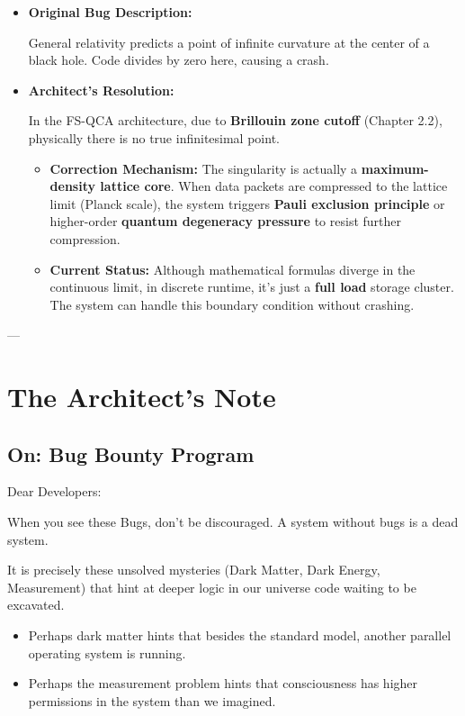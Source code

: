 \documentclass[11pt,a4paper,twoside]{book}
\begin{document}
\begin{itemize}
\item \textbf{Original Bug Description:}

General relativity predicts a point of infinite curvature at the center of a black hole. Code divides by zero here, causing a crash.

\item \textbf{Architect's Resolution:}

In the FS-QCA architecture, due to \textbf{Brillouin zone cutoff} (Chapter 2.2), physically there is no true infinitesimal point.

\begin{itemize}
\item \textbf{Correction Mechanism:} The singularity is actually a \textbf{maximum-density lattice core}. When data packets are compressed to the lattice limit (Planck scale), the system triggers \textbf{Pauli exclusion principle} or higher-order \textbf{quantum degeneracy pressure} to resist further compression.

\item \textbf{Current Status:} Although mathematical formulas diverge in the continuous limit, in discrete runtime, it's just a \textbf{full load} storage cluster. The system can handle this boundary condition without crashing.
\end{itemize}
\end{itemize}

---

\section{The Architect's Note}

\subsection{On: Bug Bounty Program}

Dear Developers:

When you see these Bugs, don't be discouraged. A system without bugs is a dead system.

It is precisely these unsolved mysteries (Dark Matter, Dark Energy, Measurement) that hint at deeper logic in our universe code waiting to be excavated.

\begin{itemize}
\item Perhaps dark matter hints that besides the standard model, another parallel operating system is running.

\item Perhaps the measurement problem hints that consciousness has higher permissions in the system than we imagined.
\end{itemize}
\end{document}
